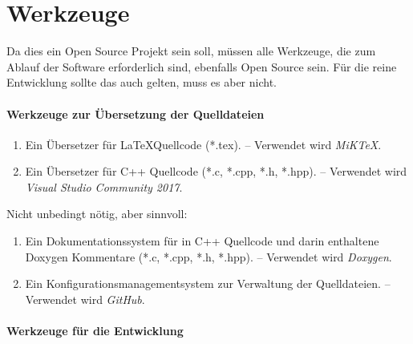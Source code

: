 \section{Werkzeuge}%
\label{sec:Werkzeuge}

Da dies ein Open Source Projekt sein soll,
müssen alle Werkzeuge,
die zum Ablauf der Software erforderlich sind,
ebenfalls Open Source sein.
Für die reine Entwicklung sollte das auch gelten, muss es aber nicht.

\paragraph{Werkzeuge zur Übersetzung der Quelldateien}%

\begin{enumerate}

	\item\label{Werkzeug:LaTeX}
	Ein Übersetzer für \LaTeX Quellcode (*.tex).
	-- Verwendet wird \emph{MiK\TeX}.

	\item\label{Werkzeug:C++}
	Ein Übersetzer für C++ Quellcode (*.c, *.cpp, *.h, *.hpp).
	-- Verwendet wird \emph{Visual Studio Community 2017}.

	\setcounter{Enumi}{\value{enumi}}%
\end{enumerate}
Nicht unbedingt nötig, aber sinnvoll:
\begin{enumerate}
	\setcounter{enumi}{\value{Enumi}}%

	\item\label{Werkzeug:Dokumentation}
	Ein Dokumentationssystem für in C++ Quellcode und darin enthaltene Doxygen Kommentare (*.c, *.cpp, *.h, *.hpp).
	-- Verwendet wird \emph{Doxygen}.

	\item\label{Werkzeug:Konfigurationsmanagement}
	Ein Konfigurationsmanagementsystem zur Verwaltung der Quelldateien.
	-- Verwendet wird \emph{GitHub}.

	\setcounter{Enumi}{\value{enumi}}%
\end{enumerate}

\paragraph{Werkzeuge für die Entwicklung}%

